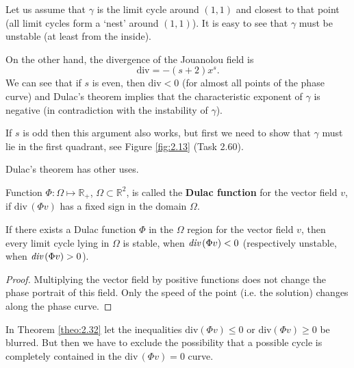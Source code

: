\begin{example}
	Let us assume that $ \gamma $ is the limit cycle around $ \left (1,1 \right) $ and closest to that point (all limit cycles form a `nest' around $ (1,1) $). It is easy to see that $ \gamma $ must be unstable (at least from the inside).
	
	On the other hand, the divergence of the Jouanolou field is
	$$
	\textrm{div}=-(s+2)x^{s}.
	$$
	We can see that if $ s $ is even, then $\textrm {div} <0 $ (for almost all points of the phase curve) and Dulac's theorem implies that the characteristic exponent of $ \gamma $ is negative (in contradiction with the instability of $ \gamma$).
	
	If $ s $ is odd then this argument also works, but first we need to show that $ \gamma $ must lie in the first quadrant, see Figure \ref{fig:2.13} (Task 2.60).
\end{example}

Dulac's theorem has other uses.

\begin{definition}
	Function $\Phi :\Omega \longmapsto \mathbb{R}_{+}$, $\Omega \subset \mathbb{R}^{2}$, is called the \textbf{Dulac function} for the vector field $v$, if $\textrm{div}\,\left( \Phi v\right) $ has a fixed sign in the domain $\Omega$.
\end{definition}

\begin{theorem}\label{theo:2.32}
	If there exists a Dulac function $\Phi $ in the $\Omega$ region  for the vector field $v$, then every limit cycle lying in $\Omega $ is stable, when $\emph{div}\left( \Phi v\right) <0$ (respectively unstable, when $\emph{div}\left( \Phi v\right) >0$).
	\begin{proof}
		Multiplying the vector field by positive functions does not change the phase portrait of this field. Only the speed of the point (i.e. the solution) changes along the phase curve.
	\end{proof}
\end{theorem}

\begin{remark}
	In Theorem \ref{theo:2.32} let the inequalities $\textrm{div}\left( \Phi v\right) \leq 0$ or $\textrm{div}\left( \Phi v\right) \geq 0$ be blurred. But then we have to exclude the possibility that a possible cycle is completely contained in the $\textrm{div}\,\left( \Phi v\right) =0$ curve.
\end{remark}

